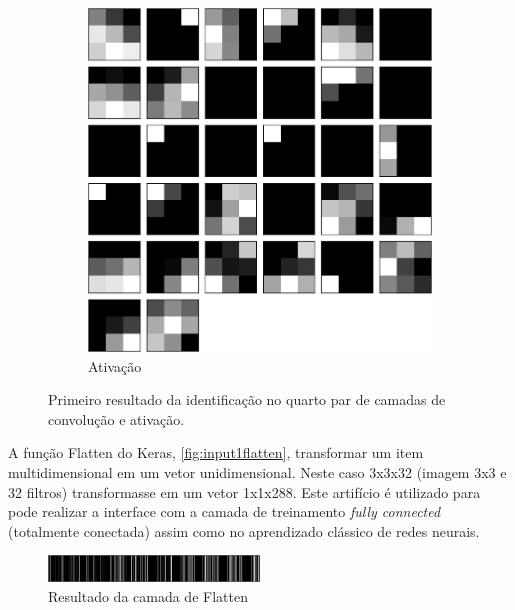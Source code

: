\documentclass[
	12pt,				%
	oneside,			%
	a4paper,			%
	english,			%
	french,				%
	spanish,			%
	brazil,				%
	]{abntex2}
\begin{document}
\begin{center}
\begin{figure}[H]
	\begin{subfigure}{.8\textwidth}
		\centering
		\includegraphics[width=.6\linewidth]{images/fabio/resultados/network_3/input_1_layer_activation_4}%
		\caption{Ativação}			
	\end{subfigure}%
	\caption{Primeiro resultado da identificação no quarto par de camadas de convolução e ativação.}
		\label{fig:camada_2}
\end{figure}
\end{center}
\par A função Flatten do Keras, \autoref{fig:input1flatten}, transformar um item multidimensional em um vetor unidimensional. Neste caso 3x3x32 (imagem 3x3 e 32 filtros) transformasse em um vetor 1x1x288. Este artifício é utilizado para pode realizar a interface com a camada de treinamento \textit{fully connected} (totalmente conectada) assim como no aprendizado clássico de redes neurais.
\begin{center}
\begin{figure}[H]
	\centering
	\includegraphics[width=0.5\textwidth]{images/fabio/resultados/network_3/input_1_layer_flatten_1}
	\caption{Resultado da camada de Flatten}
	\label{fig:input1flatten}
\end{figure}
\end{center}
\end{document}
